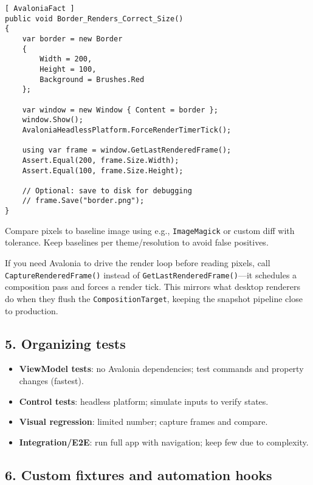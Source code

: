 \begin{lstlisting}
[ AvaloniaFact ]
public void Border_Renders_Correct_Size()
{
    var border = new Border
    {
        Width = 200,
        Height = 100,
        Background = Brushes.Red
    };

    var window = new Window { Content = border };
    window.Show();
    AvaloniaHeadlessPlatform.ForceRenderTimerTick();

    using var frame = window.GetLastRenderedFrame();
    Assert.Equal(200, frame.Size.Width);
    Assert.Equal(100, frame.Size.Height);

    // Optional: save to disk for debugging
    // frame.Save("border.png");
}
\end{lstlisting}

Compare pixels to baseline image using e.g.,
\passthrough{\lstinline!ImageMagick!} or custom diff with tolerance.
Keep baselines per theme/resolution to avoid false positives.

If you need Avalonia to drive the render loop before reading pixels,
call \passthrough{\lstinline!CaptureRenderedFrame()!} instead of
\passthrough{\lstinline!GetLastRenderedFrame()!}---it schedules a
composition pass and forces a render tick. This mirrors what desktop
renderers do when they flush the
\passthrough{\lstinline!CompositionTarget!}, keeping the snapshot
pipeline close to production.

\subsection{5. Organizing tests}\label{organizing-tests}

\begin{itemize}
\tightlist
\item
  \textbf{ViewModel tests}: no Avalonia dependencies; test commands and
  property changes (fastest).
\item
  \textbf{Control tests}: headless platform; simulate inputs to verify
  states.
\item
  \textbf{Visual regression}: limited number; capture frames and
  compare.
\item
  \textbf{Integration/E2E}: run full app with navigation; keep few due
  to complexity.
\end{itemize}

\subsection{6. Custom fixtures and automation
hooks}\label{custom-fixtures-and-automation-hooks}

